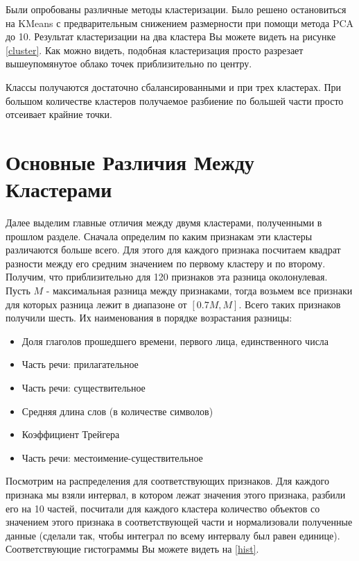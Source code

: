 \documentclass[12pt]{article}
\begin{document}
Были опробованы различные методы кластеризации. Было решено остановиться на KMeans с предварительным снижением размерности при помощи метода PCA до 10. Результат кластеризации на два кластера Вы можете видеть на рисунке \ref{cluster}. Как можно видеть, подобная кластеризация просто разрезает вышеупомянутое облако точек приблизительно по центру.

Классы получаются достаточно сбалансированными и при трех кластерах. При большом количестве кластеров получаемое разбиение по большей части просто отсеивает крайние точки.

\section{Основные Различия Между Кластерами}

Далее выделим главные отличия между двумя кластерами, полученными в прошлом разделе. Сначала определим по каким признакам эти кластеры различаются больше всего. Для этого для каждого признака посчитаем квадрат разности между его средним значением по первому кластеру и по второму. Получим, что приблизительно для 120 признаков эта разница околонулевая. Пусть $M$ - максимальная разница между признаками, тогда возьмем все признаки для которых разница лежит в диапазоне от $[0.7M, M]$. Всего таких признаков получили шесть. Их наименования в порядке возрастания разницы:

\begin{itemize}
\item Доля глаголов прошедшего времени, первого лица, единственного числа
\item Часть речи: прилагательное
\item Часть речи: существительное
\item Средняя длина слов (в количестве символов)
\item Коэффициент Трейгера
\item Часть речи: местоимение-существительное
\end{itemize}

Посмотрим на распределения для соответствующих признаков. Для каждого признака мы взяли интервал, в котором лежат значения этого признака, разбили его на 10 частей, посчитали для каждого кластера количество объектов со значением этого признака в соответствующей части и нормализовали полученные данные (сделали так, чтобы интеграл по всему интервалу был равен единице). Соответствующие гистограммы Вы можете видеть на \ref{hist}.
\end{document}
